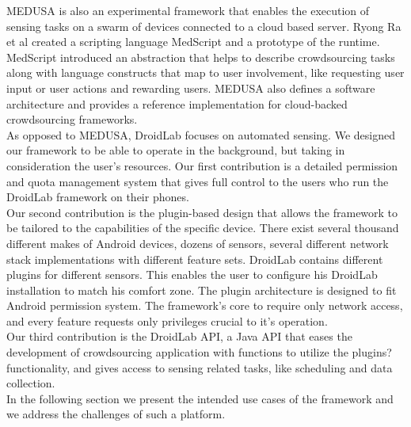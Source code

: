 \documentclass[conference,letterpaper]{IEEEtran}
\begin{document}
\indent MEDUSA \cite{Ra} is also an experimental framework that enables the execution of sensing tasks on a swarm of devices connected to a cloud based server. Ryong Ra et al created a scripting language MedScript and a prototype of the runtime. MedScript introduced an abstraction that helps to describe crowdsourcing tasks along with language constructs that map to user involvement, like requesting user input or user actions and rewarding users. MEDUSA also defines a software architecture and provides a reference implementation for cloud-backed crowdsourcing frameworks.\\
\indent As opposed to MEDUSA, DroidLab focuses on automated sensing. We designed our framework to be able to operate in the background, but taking in consideration the user's resources. Our first contribution is a detailed permission and quota management system that gives full control to the users who run the DroidLab framework on their phones.\\
\indent Our second contribution is the plugin-based design that allows the framework to be tailored to the capabilities of the specific device. There exist several thousand different makes of Android devices, dozens of sensors, several different network stack implementations with different feature sets. DroidLab contains different plugins for different sensors. This enables the user to configure his DroidLab installation to match his comfort zone. The plugin architecture is designed to fit Android permission system. The framework's core to require only network access, and every feature requests only privileges crucial to it's operation.\\
\indent Our third contribution is the DroidLab API, a Java API that eases the development of crowdsourcing application with functions to utilize the plugins? functionality, and gives access to sensing related tasks, like scheduling and data collection.\\
\indent In the following section we present the intended use cases of the framework and we address the challenges of such a platform.
\end{document}
